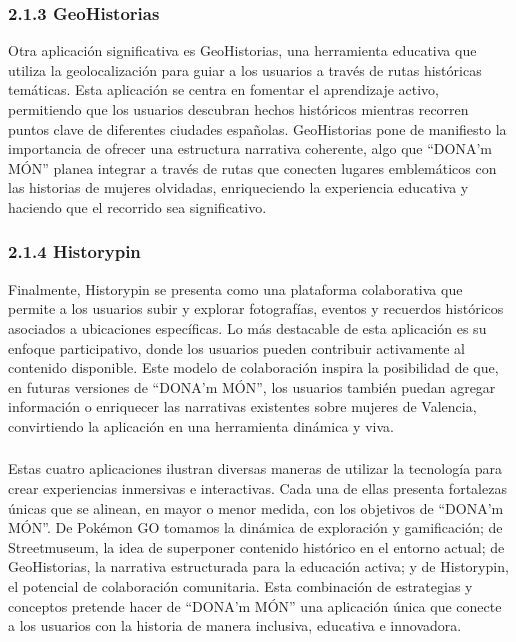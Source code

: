 \subsubsection{2.1.3 GeoHistorias}

Otra aplicación significativa es GeoHistorias, una herramienta educativa que utiliza la geolocalización para guiar a los usuarios a través de rutas históricas temáticas. Esta aplicación se centra en fomentar el aprendizaje activo, permitiendo que los usuarios descubran hechos históricos mientras recorren puntos clave de diferentes ciudades españolas. GeoHistorias pone de manifiesto la importancia de ofrecer una estructura narrativa coherente, algo que “DONA’m MÓN” planea integrar a través de rutas que conecten lugares emblemáticos con las historias de mujeres olvidadas, enriqueciendo la experiencia educativa y haciendo que el recorrido sea significativo.

\subsubsection{2.1.4 Historypin}

Finalmente, Historypin se presenta como una plataforma colaborativa que permite a los usuarios subir y explorar fotografías, eventos y recuerdos históricos asociados a ubicaciones específicas. Lo más destacable de esta aplicación es su enfoque participativo, donde los usuarios pueden contribuir activamente al contenido disponible. Este modelo de colaboración inspira la posibilidad de que, en futuras versiones de “DONA’m MÓN”, los usuarios también puedan agregar información o enriquecer las narrativas existentes sobre mujeres de Valencia, convirtiendo la aplicación en una herramienta dinámica y viva.

\subsubsection{}
Estas cuatro aplicaciones ilustran diversas maneras de utilizar la tecnología para crear experiencias inmersivas e interactivas. Cada una de ellas presenta fortalezas únicas que se alinean, en mayor o menor medida, con los objetivos de “DONA’m MÓN”. De Pokémon GO tomamos la dinámica de exploración y gamificación; de Streetmuseum, la idea de superponer contenido histórico en el entorno actual; de GeoHistorias, la narrativa estructurada para la educación activa; y de Historypin, el potencial de colaboración comunitaria. Esta combinación de estrategias y conceptos pretende hacer de “DONA’m MÓN” una aplicación única que conecte a los usuarios con la historia de manera inclusiva, educativa e innovadora.

